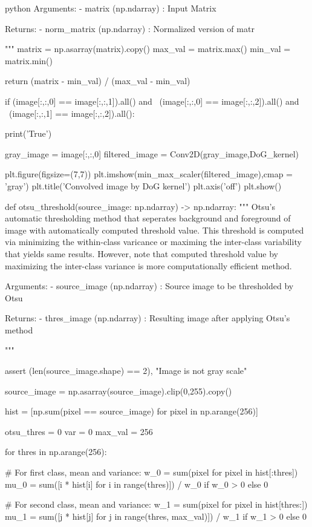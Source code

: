\documentclass[12pt]{amsart}
\begin{document}
\begin{mintedbox}{python}
    Arguments:
      -  matrix     (np.ndarray) : Input Matrix

    Returns:
      - norm_matrix (np.ndarray) : Normalized version of matr

  """
  matrix = np.asarray(matrix).copy()
  max_val = matrix.max()
  min_val = matrix.min()

  return (matrix - min_val) / (max_val - min_val)

if (image[:,:,0] == image[:,:,1]).all() and \
   (image[:,:,0] == image[:,:,2]).all() and \
   (image[:,:,1] == image[:,:,2]).all():

   print('True')


gray_image = image[:,:,0]
filtered_image = Conv2D(gray_image,DoG_kernel)

plt.figure(figsize=(7,7))
plt.imshow(min_max_scaler(filtered_image),cmap = 'gray')
plt.title('Convolved image by DoG kernel')
plt.axis('off')
plt.show()

def otsu_threshold(source_image: np.ndarray) -> np.ndarray:
    """
    Otsu's automatic thresholding method that seperates background and
    foreground of image with automatically computed threshold value. This 
    threshold is computed via minimizing the within-class varicance or 
    maximing the inter-class variability that yields same results. However,
    note that computed threshold value by maximizing the inter-class variance
    is more computationally efficient method. 

      Arguments:
        - source_image (np.ndarray) : Source image to be thresholded by Otsu

      Returns:
        - thres_image  (np.ndarray) : Resulting image after applying Otsu's method
 

  """

    assert (len(source_image.shape) == 2), "Image is not gray scale"     
    
    source_image =  np.asarray(source_image).clip(0,255).copy()

    hist =  [np.sum(pixel == source_image) for pixel in np.arange(256)]

    
    otsu_thres = 0
    var = 0
    max_val = 256
    
    for thres in np.arange(256):

      # For first class, mean and variance:
      w_0 = sum(pixel for pixel in hist[:thres])
      mu_0 = sum([i * hist[i] for i in range(thres)]) / w_0 if w_0 > 0 else 0   

      # For second class, mean and variance:
      w_1 = sum(pixel for pixel in hist[thres:])          
      mu_1 = sum([j * hist[j] for j in range(thres, max_val)]) / w_1 if w_1 > 0 else 0


\end{mintedbox}
\end{document}
